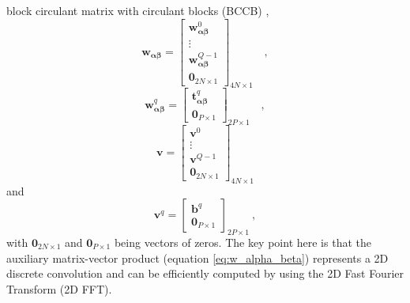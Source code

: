 \documentclass[manuscript]{geophysics}
\begin{document}
block circulant matrix with circulant blocks (BCCB) \citep[e.g., ][ p. 184]{davis1979},
\begin{equation}
	\mathbf{w}_{\boldsymbol{\alpha\beta}} = \begin{bmatrix}
		\mathbf{w}_{\boldsymbol{\alpha\beta}}^{0} \\
		\vdots \\
		\mathbf{w}_{\boldsymbol{\alpha\beta}}^{Q - 1} \\
		\mathbf{0}_{2N \times 1}
	\end{bmatrix}_{4N \times 1} \quad ,
	\label{eq:w_alpha_beta_partitioned}
\end{equation}
\begin{equation}
	\mathbf{w}_{\boldsymbol{\alpha\beta}}^{q} = \begin{bmatrix}
		\mathbf{t}^{q}_{\boldsymbol{\alpha\beta}} \\
		\mathbf{0}_{P \times 1}
	\end{bmatrix}_{2P \times 1}
	\label{eq:wq-vector} \quad ,
\end{equation}
\begin{equation}
	\mathbf{v} = \begin{bmatrix}
		\mathbf{v}^{0} \\
		\vdots \\
		\mathbf{v}^{Q - 1} \\
		\mathbf{0}_{2N \times 1}
	\end{bmatrix}_{4N \times 1}
	\label{eq:v-vector}
\end{equation}
and
\begin{equation}
	\mathbf{v}^{q} = \begin{bmatrix}
		\mathbf{b}^{q} \\
		\mathbf{0}_{P \times 1}
	\end{bmatrix}_{2P \times 1} \: ,
	\label{eq:vq-vector} 
\end{equation}
with $\mathbf{0}_{2N \times 1}$ and $\mathbf{0}_{P \times 1}$ being vectors of zeros.
The key point here is that the auxiliary matrix-vector product
(equation \ref{eq:w_alpha_beta}) represents a 2D discrete convolution and can be 
efficiently computed by using the 2D Fast Fourier Transform (2D FFT). 
\end{document}
